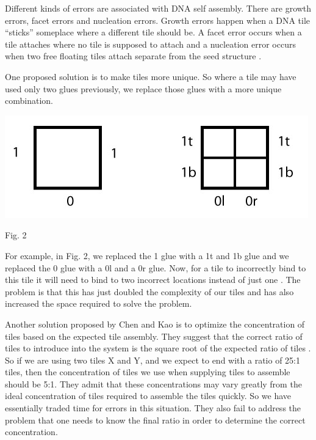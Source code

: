 \documentclass[twocolumn]{article}
\begin{document}
Different kinds of errors are associated with DNA self assembly. There are 
growth errors, facet errors and nucleation errors. Growth errors happen when a 
DNA tile “sticks” someplace  where a different tile should be. A facet error 
occurs when a tile attaches where no tile is supposed to attach and a 
nucleation error occurs when two free floating tiles attach separate from the 
seed structure \cite{chen_04} \cite{chen}.

One proposed solution is to make tiles more unique. So where a tile may have 
used only two glues previously, we replace those glues with a more unique
combination.

\vspace{1em}

\includegraphics[scale=0.47]{moreGlue.png}
\begin{center}Fig. 2\end{center}

\vspace{1em}

For example, in Fig. 2, we replaced the 1 glue with a 1t and 1b glue and we 
replaced the 0 glue with a 0l and a 0r glue. Now, for a tile to incorrectly 
bind to this tile it will need to bind to two incorrect locations instead of 
just one \cite{chen_04}. The problem is that this has just doubled the
complexity of our 
tiles and has also increased the space required to solve the problem.

Another solution proposed by Chen and Kao is to optimize the concentration of
tiles based on the expected tile assembly. They suggest that the correct ratio
of 
tiles to introduce into the system is the square root of the expected ratio of 
tiles \cite{chen}. So if we are using two tiles X and Y, and we expect to end
with a 
ratio of 25:1 tiles, then the concentration of tiles we use when supplying
tiles
to assemble should be 5:1. They admit that these concentrations may vary 
greatly from the ideal concentration of tiles required to assemble the tiles 
quickly. So we have essentially traded time for errors in this situation. They
also fail to address the problem that one needs to know the final ratio in 
order to determine the correct concentration.
\end{document}
